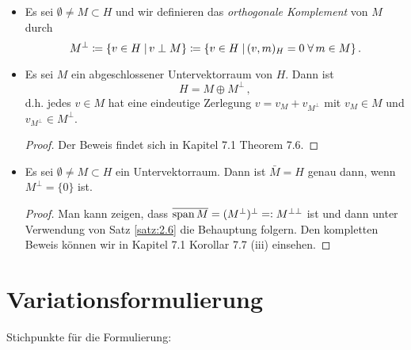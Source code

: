 \begin{itemize}
\item \begin{defi}
Es sei $\emptyset\neq M\subset H$ und wir definieren das \textit{{orthogonale Komplement}} von $M$ durch
\[
	M^\perp\coloneqq\{v\in H\;\vert\, v\perp M\}\coloneqq\{v\in H\;\vert\, (v, m)_H=0\;\forall\,  m\in M\}\, .
\]
\end{defi}

\item \begin{satz}\label{satz:2.6}
 Es sei $M$ ein abgeschlossener Untervektorraum von $H$. Dann ist
  \[
  	H=M\oplus M^\perp\, , 
  \]
  d.h. jedes $v\in M$ hat eine eindeutige Zerlegung $v=v_M+v_{M^\perp}$ mit $v_M\in M$ und $v_{M^\perp}\in M^\perp$.
\end{satz}

\begin{proof}
Der Beweis findet sich in \cite{Walker} Kapitel 7.1 Theorem 7.6.
\end{proof}

\item \begin{kor}\label{kor:2.6}
Es sei $\emptyset \not = M \subset H$   ein Untervektorraum. Dann ist $\bar M = H$ genau dann, wenn $M^\perp = \{0\}$ ist.
\end{kor}

\begin{proof}
Man kann zeigen, dass $\overline{\operatorname{span} M} = (M^\perp)^\perp =: M^{\perp\perp}$ ist und dann unter Verwendung von Satz \ref{satz:2.6} die Behauptung folgern. Den kompletten Beweis können wir in \cite{Walker} Kapitel 7.1 Korollar 7.7 (iii) einsehen.
\end{proof}
\end{itemize}
 

\section{Variationsformulierung}


Stichpunkte für die Formulierung:

